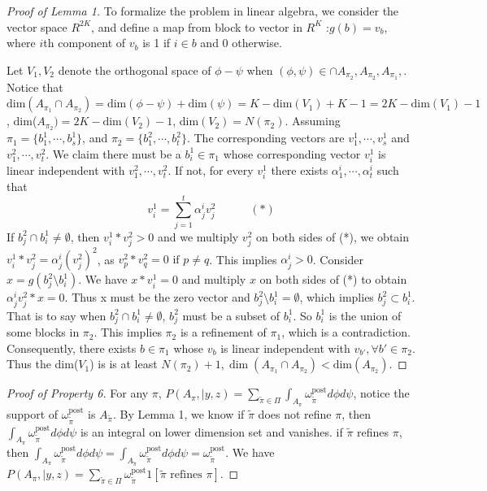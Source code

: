 \documentclass[aoas,preprint]{imsart}
\begin{document}
\begin{proof}[Proof of Lemma 1]
To formalize the problem in linear algebra, 
we consider the vector space $R^{2K}$, and define a map from block to vector in $R^K$ :$g(b) = v_b$, where $i$th component of $v_b$ is 1 if $i \in b$ and 0 otherwise.

Let $V_1, V_2$ denote the orthogonal space of $\phi - \psi$ when $(\phi,\psi)\in  \cap A_{\pi_2}, A_{\pi_2}, A_{\pi_1},$. Notice that $\text{dim}(A_{\pi_1} \cap A_{\pi_2}) = \text{dim}(\phi - \psi) + \text{dim}(\psi) = K - \text{dim}(V_1)  + K- 1=  2K -  \text{dim}(V_1)  -1$, dim($A_{\pi_2}) = 2K - \text{dim}(V_2) - 1$, dim$(V_2) = N(\pi_2)$.
Assuming $\pi_1 = \{b_1^1,\cdots,b_s^1\}$, and  $\pi_2 = \{b_1^2,\cdots,b_t^2\}$. 
The corresponding vectors are $v_1^1,\cdots,v_s^1$ and $v_1^2,\cdots,v_t^2$. 
We claim there must be a $b_i^1\in \pi_1$ whose corresponding vector $v_i^1$ is linear independent 
with $v_1^2,\cdots,v_t^2$. If not, for every $v_i^1$ there exists $\alpha_1^i,\cdots,\alpha_t^i$ 
such that 
\[
v_i^1 = \sum_{j = 1}^t \alpha_j^i v_j^2 \quad\quad\quad(*)
\]
If $b_j^2 \cap b_i^1 \neq \emptyset$, then $v_i^1 * v_j^2 > 0$ and we multiply $v_j^2$ on both sides of (*), we obtain $v_i^1 * v_j^2 = \alpha_j^i (v_j^2)^2$, as $v_p^2 * v_q^2 = 0 \text{ if } p\neq q$. This implies $\alpha_j^i > 0$. Consider $x = g(b_j^2\setminus b_i^1)$. We have $x*v_i^1 = 0$ and multiply $x$ on both sides of (*) to obtain $\alpha_j^i v_j^2*x = 0$. Thus x must be the zero vector and $b_j^2\setminus b_i^1= \emptyset$, which implies $b_j^2 \subset b_i^1$. That is to say when $b_j^2 \cap b_i^1 \neq \emptyset$, $b_j^2$ must 
be  a subset of $b_i^1$. So $b_i^1$ is the union of some blocks in $\pi_2$.  
 This implies $\pi_2$ is a refinement of $\pi_1$, which is  a contradiction.
Consequently, there exists $b\in\pi_1$ whose $v_b$ is linear independent with $v_{b'}, \forall b'\in\pi_2$. Thus the dim($V_1$) is is at least $N(\pi_2) + 1, \dim(A_{\pi_1} \cap A_{\pi_2}) < \text{dim}(A_{\pi_2})$.
\end{proof}

\begin{proof}[Proof of Property 6]
For any $\pi$, $P(A_\pi, | y, z) = \underset{\tilde \pi \in \Pi}{\sum} \int_{A_{\pi}} \omega_{\tilde \pi}^{\text{post}} d\phi d\psi$, 
notice the support of $\omega_{\tilde \pi}^{\text{post}}$ is $A_{\tilde \pi}$. 
By Lemma 1, we know if $\tilde \pi$ does not refine $\pi$, then $\int_{A_{\pi}} \omega_{\tilde \pi}^{\text{post}} d\phi d\psi$ is an integral on lower dimension set and vanishes. if $\tilde \pi$ refines $\pi$, then 
$\int_{A_{\pi}} \omega_{\tilde \pi}^{\text{post}} d\phi d\psi = \int_{A_{\tilde \pi}} \omega_{\tilde \pi}^{\text{post}} d\phi d\psi = \omega_{\tilde \pi}^{\text{post}}$. We have $P(A_\pi, | y, z) = \underset{\tilde \pi \in \Pi}{\sum} \omega_{\tilde \pi}^{\text{post}} 1[\tilde \pi \text{ refines } \pi ]$.
\end{proof}
\end{document}
